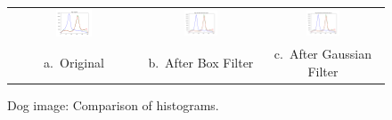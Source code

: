 \documentclass[]{IEEEtran}
\begin{document}
  \begin{figure}[t]
  \centering
  \begin{tabular}{c c c}
  \includegraphics[width=0.3\textwidth]{./figures/3/dog-rgbhist.png} &
  \includegraphics[width=0.3\textwidth]{./figures/3/dog-3-1-1-box9-rgbhist.png} &
  \includegraphics[width=0.3\textwidth]{./figures/3/dog-3-1-1-gaussian15-rgbhist.png} \\
  a.~Original & b.~After Box Filter & c.~After Gaussian Filter
  \end{tabular}
  \caption{Dog image: Comparison of histograms.}
  \label{figure:dog-rgb-hist}
\end{figure}
\end{document}
